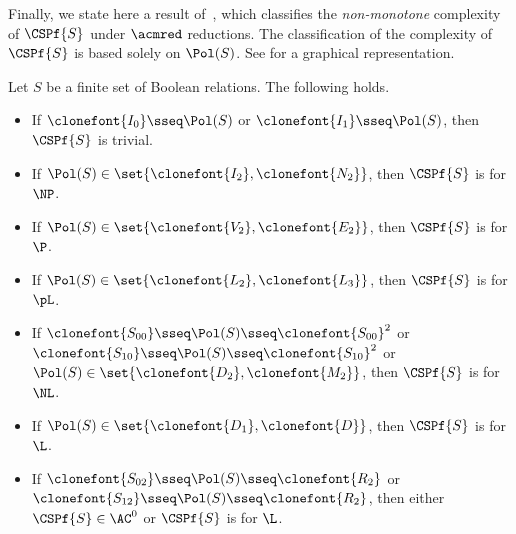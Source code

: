\documentclass[11pt]{article}
\begin{document}
Finally, 
we state here a result of~\cite{DBLP:journals/jcss/AllenderBISV09},
which
classifies the \emph{non-monotone} complexity of $\CSPf{S}$
under $\acmred$ reductions.
The classification of the complexity of $\CSPf{S}$
is based solely on $\Pol(S)$.
See  for a graphical representation.

\begin{theorem}
    \label{thm:refined-completeness}
    Let $S$ be a finite set of Boolean relations.
    The following holds.
    \begin{itemize}
        \item If 
            $\clonefont{I_0} \sseq \Pol(S)$
            or 
            $\clonefont{I_1} \sseq \Pol(S)$,
            then
            $\CSPf{S}$ is trivial.
        \item 
            If 
            $\Pol(S) \in \set{\clonefont{I_2},\clonefont{N_2}}$,
            then
            $\CSPf{S}$
            is
            \acmcmpl{}
            for
            $\NP$.
        \item 
            If 
            $\Pol(S) \in 
            \set{\clonefont{V_2},\clonefont{E_2}}$,
            then
            $\CSPf{S}$
            is
            \acmcmpl{}
            for
            $\P$.
        \item 
            If 
            $\Pol(S) \in 
            \set{\clonefont{L_2},\clonefont{L_3}}$,
            then
            $\CSPf{S}$
            is
            \acmcmpl{}
            for
            $\pL$.
        \item 
            If 
            $\clonefont{S_{00}} \sseq \Pol(S) \sseq \clonefont{S_{00}}^2$
            or
            $\clonefont{S_{10}} \sseq \Pol(S) \sseq \clonefont{S_{10}}^2$
            or
            $\Pol(S) \in 
            \set{\clonefont{D_2},\clonefont{M_2}}$,
            then
            $\CSPf{S}$
            is
            \acmcmpl{}
            for
            $\NL$.
        \item 
            If 
            $\Pol(S) \in 
            \set{\clonefont{D_1}, \clonefont{D}}$,
            then
            $\CSPf{S}$
            is
            \acmcmpl{}
            for
            $\L$.
        \item 
            If 
            $\clonefont{S_{02}} \sseq \Pol(S) \sseq \clonefont{R_2}$
            or
            $\clonefont{S_{12}} \sseq \Pol(S) \sseq \clonefont{R_2}$,
            then
            either
            $\CSPf{S} \in \AC^0$
            or
            $\CSPf{S}$
            is
            \acmcmpl{}
            for
            $\L$.
    \end{itemize}
\end{theorem}
\end{document}
